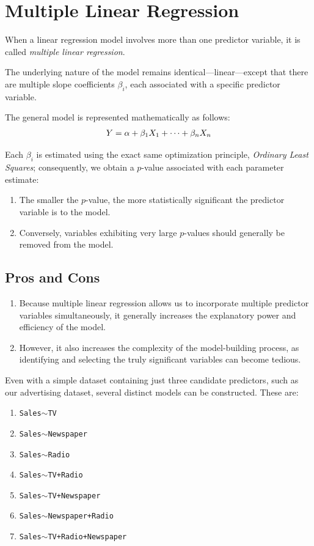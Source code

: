 \section{Multiple Linear Regression}

When a linear regression model involves more than one predictor variable, it is called \emph{multiple linear regression}.

The underlying nature of the model remains identical—linear—except that there are multiple slope coefficients $\beta_i$, each associated with a specific predictor variable.

The general model is represented mathematically as follows:
\begin{align}
	Y = \alpha + \beta_{1}X_{1} + \dots + \beta_{n}X_{n}
\end{align}

Each $\beta_i$ is estimated using the exact same optimization principle, \emph{Ordinary Least Squares}; consequently, we obtain a $p$-value associated with each parameter estimate:
\begin{enumerate}
	\item The smaller the $p$-value, the more statistically significant the predictor variable is to the model.
	\item Conversely, variables exhibiting very large $p$-values should generally be removed from the model.
\end{enumerate}

\subsection{Pros and Cons}
\begin{enumerate}
	\item Because multiple linear regression allows us to incorporate multiple predictor variables simultaneously, it generally increases the explanatory power and efficiency of the model.
	\item However, it also increases the complexity of the model-building process, as identifying and selecting the truly significant variables can become tedious.
\end{enumerate}

Even with a simple dataset containing just three candidate predictors, such as our advertising dataset, several distinct models can be constructed. These are:
\begin{enumerate}[Model 1:]
	\item \texttt{Sales$\sim$TV}
	\item \texttt{Sales$\sim$Newspaper}
	\item \texttt{Sales$\sim$Radio}
	\item \texttt{Sales$\sim$TV+Radio}
	\item \texttt{Sales$\sim$TV+Newspaper}
	\item \texttt{Sales$\sim$Newspaper+Radio}
	\item \texttt{Sales$\sim$TV+Radio+Newspaper}
\end{enumerate}

